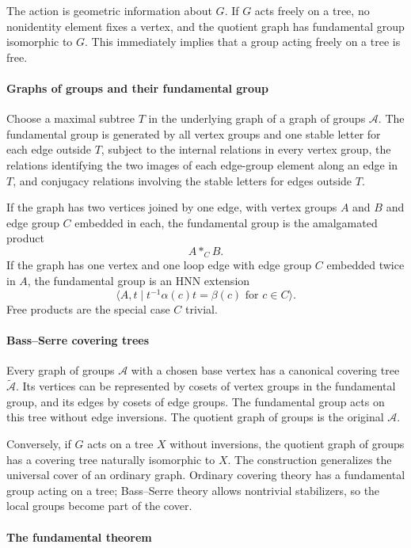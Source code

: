 The action is geometric information about $G$. If $G$ acts freely on a tree, no nonidentity element fixes a vertex, and the quotient graph has fundamental group isomorphic to $G$. This immediately implies that a group acting freely on a tree is free.

\paragraph{Graphs of groups and their fundamental group}

Choose a maximal subtree $T$ in the underlying graph of a graph of groups $\mathcal A$. The fundamental group is generated by all vertex groups and one stable letter for each edge outside $T$, subject to the internal relations in every vertex group, the relations identifying the two images of each edge-group element along an edge in $T$, and conjugacy relations involving the stable letters for edges outside $T$.

If the graph has two vertices joined by one edge, with vertex groups $A$ and $B$ and edge group $C$ embedded in each, the fundamental group is the amalgamated product
\[
 A*_C B.
\]
If the graph has one vertex and one loop edge with edge group $C$ embedded twice in $A$, the fundamental group is an HNN extension
\[
 \langle A,t\mid t^{-1}\alpha(c)t=\beta(c)\text{ for }c\in C\rangle.
\]
Free products are the special case $C$ trivial.

\paragraph{Bass--Serre covering trees}

Every graph of groups $\mathcal A$ with a chosen base vertex has a canonical covering tree $\widetilde{\mathcal A}$. Its vertices can be represented by cosets of vertex groups in the fundamental group, and its edges by cosets of edge groups. The fundamental group acts on this tree without edge inversions. The quotient graph of groups is the original $\mathcal A$.

Conversely, if $G$ acts on a tree $X$ without inversions, the quotient graph of groups has a covering tree naturally isomorphic to $X$. The construction generalizes the universal cover of an ordinary graph. Ordinary covering theory has a fundamental group acting on a tree; Bass--Serre theory allows nontrivial stabilizers, so the local groups become part of the cover.

\paragraph{The fundamental theorem}

